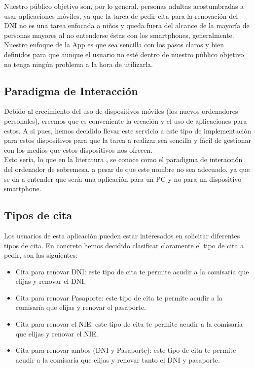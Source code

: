 \documentclass[a4paper,11pt]{article}
\begin{document}
Nuestro público objetivo son, por lo general, personas adultas acostumbradas a usar aplicaciones móviles, ya que la tarea de pedir cita para la renovación del DNI no es una tarea enfocada a niños y queda fuera del alcance de la mayoría de personas mayores al no entenderse éstas con los smartphones, generalmente. Nuestro enfoque de la App es que sea sencilla con los pasos claros y bien definidos para que aunque el usuario no esté dentro de nuestro público objetivo no tenga ningún problema a la hora de utilizarla.



\subsection{Paradigma de Interacción}
Debido al crecimiento del uso de dispositivos móviles (los nuevos ordenadores personales), creemos que es conveniente la creación y el uso de aplicaciones para estos. A si pues, hemos decidido llevar este servicio a este tipo de implementación para estos dispositivos para que la tarea a realizar sea sencilla y fácil de gestionar con los medios que estos dispositivos nos ofrecen.\\
Esto sería, lo que en la literatura \cite{gonzalez2016paradigmas}, se conoce como el paradigma de interacción del ordenador de sobremesa, a pesar de que este nombre no sea adecuado, ya que se da a entender que sería una aplicación para un PC y no para un dispositivo smartphone.

\subsection{Tipos de cita}
Los usuarios de esta aplicación pueden estar interesados en solicitar diferentes tipos de cita. En concreto hemos decidido clasificar claramente el tipo de cita a pedir, son las siguientes:

\begin{itemize}
\item Cita para renovar DNI: este tipo de cita te permite acudir a la comisaría que elijas y renovar el DNI.
\item Cita para renovar Pasaporte: este tipo de cita te permite acudir a la comisaría que elijas y renovar el pasaporte.
\item Cita para renovar el NIE: este tipo de cita te permite acudir a la comisaría que elijas y renovar el NIE.
\item Cita para renovar ambos (DNI y Pasaporte): este tipo de cita te permite acudir a la comisaría que elijas y renovar tanto el DNI y pasaporte.
\end{itemize}
\end{document}
